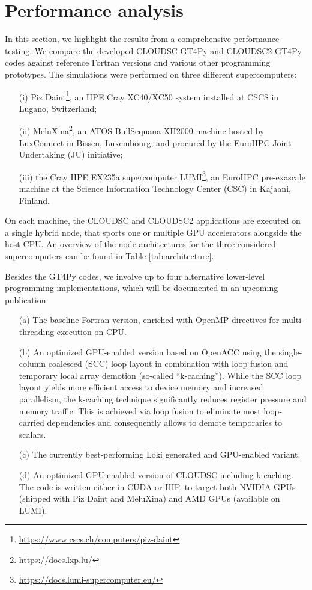 \documentclass[main.tex]{subfiles}
\begin{document}
    \justifying

    \section{Performance analysis}
    \label{section:performance-analysis}
       
        In this section, we highlight the results from a comprehensive performance testing. We compare the developed CLOUDSC-GT4Py and CLOUDSC2-GT4Py codes against reference Fortran versions and various other programming prototypes. The simulations were performed on three different supercomputers: 
        \begin{itemize}
            \item[(i)] Piz Daint\footnote{\url{https://www.cscs.ch/computers/piz-daint}}, an HPE Cray XC40/XC50 system installed at CSCS in Lugano, Switzerland;
            \item[(ii)] MeluXina\footnote{\url{https://docs.lxp.lu/}}, an ATOS BullSequana XH2000 machine hosted by LuxConnect in Bissen, Luxembourg, and procured by the EuroHPC Joint Undertaking (JU) initiative;
            \item[(iii)] the Cray HPE EX235a supercomputer LUMI\footnote{\url{https://docs.lumi-supercomputer.eu/}}, an EuroHPC pre-exascale machine at the Science Information Technology Center (CSC) in Kajaani, Finland.
        \end{itemize} 
        On each machine, the CLOUDSC and CLOUDSC2 applications are executed on a single hybrid node, that sports one or multiple GPU accelerators alongside the host CPU. An overview of the node architectures for the three considered supercomputers can be found in Table \ref{tab:architecture}. 
        
        Besides the GT4Py codes, we involve up to four alternative lower-level programming implementations, which will be documented in an upcoming publication.
        \begin{itemize}
            \item[(a)] The baseline Fortran version, enriched with OpenMP directives for multi-threading execution on CPU.
            \item[(b)] An optimized GPU-enabled version based on OpenACC using the single-column coalesced (SCC) loop layout in combination with loop fusion and temporary local array demotion (so-called ``k-caching''). While the SCC loop layout yields more efficient access to device memory and increased parallelism, the k-caching technique significantly reduces register pressure and memory traffic. This is achieved via loop fusion to eliminate most loop-carried dependencies and consequently allows to demote temporaries to scalars.
            \item[(c)] The currently best-performing Loki generated and GPU-enabled variant.
            \item[(d)] An optimized GPU-enabled version of CLOUDSC including k-caching. The code is written either in CUDA or HIP, to target both NVIDIA GPUs (shipped with Piz Daint and MeluXina) and AMD GPUs (available on LUMI).
        \end{itemize}
        
\end{document}
